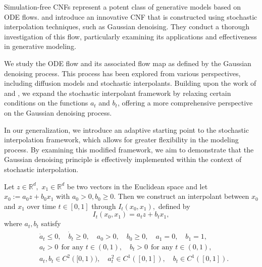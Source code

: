 \documentclass[twoside,11pt]{article}
\def\sR{{\mathbb{R}}}
\numberwithin{equation}{section}
\begin{document}
Simulation-free CNFs represent a potent class of generative models based on ODE flows. \citet{albergo2023building} and \citet{albergo2023stochastic} introduce an innovative CNF that is constructed using stochastic interpolation techniques, such as Gaussian denoising. They conduct a thorough investigation of this flow, particularly examining its applications and effectiveness in  generative modeling.

We study the ODE flow and its associated flow map as defined by the Gaussian denoising process. This process has been explored from various perspectives, including diffusion models and stochastic interpolants. Building upon the work of \citet{albergo2023building} and \citet{albergo2023stochastic}, we expand the stochastic interpolant framework by relaxing certain conditions on the functions $a_t$ and $b_t$, offering a more comprehensive perspective on the Gaussian denoising process.

In our generalization, we introduce an adaptive starting point to the stochastic interpolation framework, which allows for greater flexibility in the modeling process. By examining this modified framework, we aim to demonstrate that the Gaussian denoising principle is effectively implemented within the context of stochastic interpolation.

\begin{definition}  \label{def:vec-interp}
Let $z \in \sR^d,$  $x_1 \in \sR^d$ be two vectors in the Euclidean space and let $x_0 := a_0 z + b_0 x_1$ with $a_0 > 0, b_0 \ge 0$.
Then we construct an interpolant between $x_0$ and $x_1$ over time $t \in [0, 1]$ through $I_t(x_0, x_1),$ defined by
\begin{equation}
    \label{eq:vec-interp}
    I_t (x_0, x_1) = a_t z + b_t x_1,
\end{equation}
where $a_t, b_t$ satisfy
\begin{align}
\label{eq:abt}
\begin{aligned}
& \dot{a}_t \le 0, \quad \dot{b}_t \ge 0, \quad a_0 > 0, \quad b_0 \ge 0, \quad a_1 = 0, \quad b_1 = 1,\\
& a_t > 0 \ \ \text{for any $t \in (0,1)$}, \quad b_t >0 \ \ \text{for any $t \in (0,1)$}, \\
& a_t, b_t \in C^2([0,1)), \quad a_t^2 \in C^1([0, 1]), \quad b_t \in C^1([0, 1]).
\end{aligned}
\end{align}
\end{definition}
\end{document}
